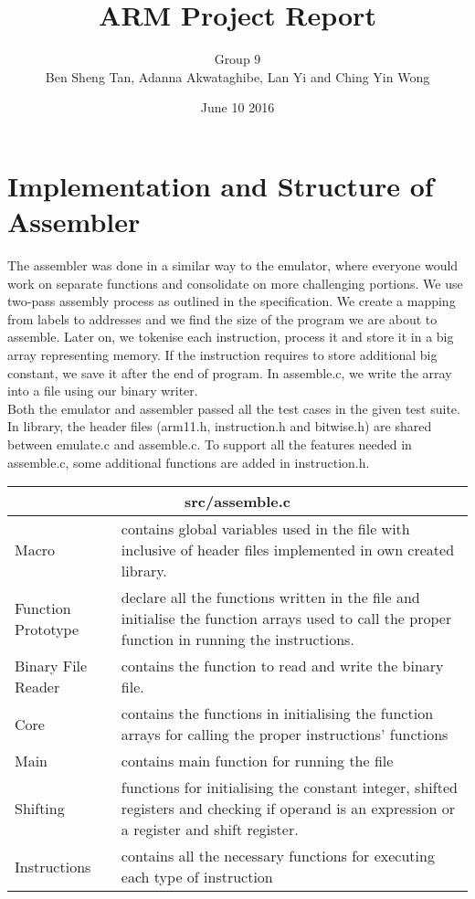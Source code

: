 \documentclass[11pt]{article}
\title{ARM Project Report}
\author{Group 9\\Ben Sheng Tan, Adanna Akwataghibe, Lan Yi and Ching Yin Wong}
\date{June 10 2016}
\begin{document}
\maketitle

\section{Implementation and Structure of Assembler}

The assembler was done in a similar way to the emulator, where everyone would
work on separate functions and consolidate on more challenging portions. We
use two-pass assembly process as outlined in the specification. We create a
mapping from labels to addresses and we find the size of the program we are
about to assemble. Later on, we tokenise each instruction, process it and store
it in a big array representing memory. If the instruction requires to store
additional big constant, we save it after the end of program. In assemble.c,
we write the array into a file using our binary writer.\\

Both the emulator and assembler passed all the test cases in the given test
suite. In library, the header files (arm11.h, instruction.h and bitwise.h)
are shared between emulate.c and assemble.c. To support all the features needed
in assemble.c, some additional functions are added in instruction.h.

\medskip

\begin{tabular}{ |p{5cm}|p{10cm}| }
\hline
\multicolumn{2}{|c|}{src/assemble.c} \\
\hline
Macro & contains global variables used in the file with inclusive of header
files implemented in own created library. \\
\hline
Function Prototype &  declare all the functions written in the file and
initialise the function arrays used to call the proper function in running
the instructions. \\
\hline
Binary File Reader &  contains the function to read and write the binary file.\\
\hline
Core & contains the functions in initialising the function arrays for calling
the proper instructions' functions \\
\hline
Main & contains main function for running the file \\
\hline
Shifting & functions for initialising the constant integer, shifted registers
and checking if operand is an expression or a register and shift register. \\
\hline
Instructions & contains all the necessary functions for executing each type of
instruction \\
\hline
\end{tabular}
\end{document}
